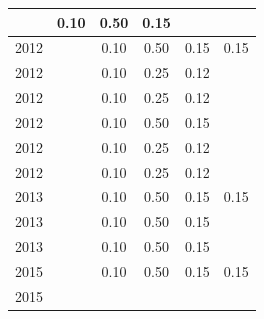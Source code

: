 \begin{table}[H]
\begin{tabular}{| l | c | c | c | c | c |}
          &
          0.10
          &
          0.50
          &
          0.15
          &
          \\
\hline
            2012
          &
          
          &
          0.10
          &
          0.50
          &
          0.15
          &
            {\color{red} 0.15}
          \\
            2012
          &
          
          &
          0.10
          &
          0.25
          &
          0.12
          &
          \\
            2012
          &
          
          &
          0.10
          &
          0.25
          &
          0.12
          &
          \\
            2012
          &
          
          &
          0.10
          &
          0.50
          &
          0.15
          &
          \\
            2012
          &
          
          &
          0.10
          &
          0.25
          &
          0.12
          &
          \\
            2012
          &
          
          &
          0.10
          &
          0.25
          &
          0.12
          &
          \\
\hline
            2013
          &
          
          &
          0.10
          &
          0.50
          &
          0.15
          &
            {\color{red} 0.15}
          \\
            2013
          &
          
          &
          0.10
          &
          0.50
          &
          0.15
          &
          \\
            2013
          &
          
          &
          0.10
          &
          0.50
          &
          0.15
          &
          \\
\hline
            2015
          &
          
          &
          0.10
          &
          0.50
          &
          0.15
          &
            {\color{red} 0.15}
          \\
            2015
          &
          

\end{tabular}
\end{table}
